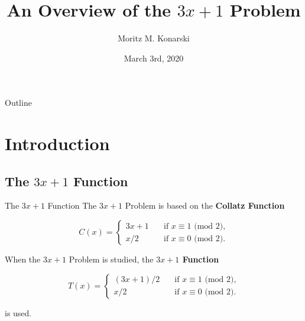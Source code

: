\documentclass[hyperref={colorlinks,allcolors=black}]{beamer}
\title[$3x+1$ Problem]{An Overview of the $3x+1$ Problem}
\author[M. Konarski]{Moritz M. Konarski}
\institute[AUCA]{Applied Mathematics Department, \newline 
    American University of Central Asia}
\date{March 3rd, 2020}
\begin{document}
\begin{frame}
  \titlepage
\end{frame}

\begin{frame}{Outline}
  \tableofcontents
\end{frame}


\section{Introduction}

\subsection[Function]{The $3x+1$ Function}


\begin{frame}{The $3x+1$ Function}
The $3x+1$ Problem is based on the \textbf{Collatz Function}

\begin{equation}
\nonumber
C(x)= \left\{
    \begin{array}{ll}
        3x+1 \quad &\text{if } x \equiv 1 \text{ (mod 2),} \\
        x/2 \quad &\text{if } x \equiv 0 \text{ (mod 2).}
    \end{array}
\right.
\end{equation}

When the $3x+1$ Problem is studied, the \textbf{$3x+1$ Function}

\begin{equation}
\nonumber
T(x)= \left\{
    \begin{array}{ll}
        (3x+1)/2 \quad &\text{if } x \equiv 1 \text{ (mod 2),} \\
        x/2 \quad &\text{if } x \equiv 0 \text{ (mod 2).}
    \end{array}
\right.
\end{equation}

is used.
\end{frame}

\end{document}
